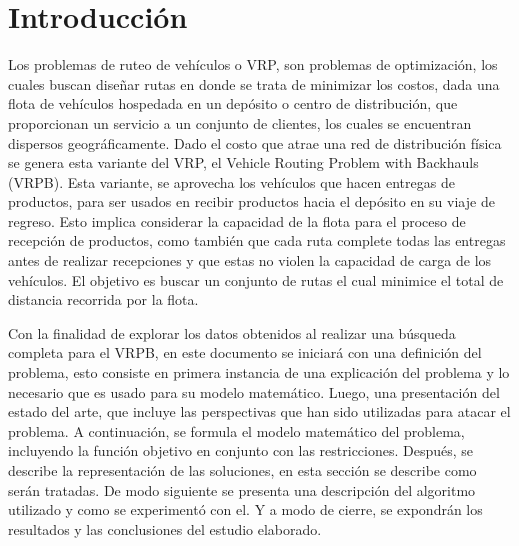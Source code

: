 \documentclass[letter, 10pt]{article}
\begin{document}
\section{Introducción}

Los problemas de ruteo de vehículos o VRP, son problemas de optimización, los cuales buscan diseñar rutas en donde se trata de minimizar los costos, dada una flota de vehículos hospedada en un depósito o centro de distribución, que proporcionan un servicio a un conjunto de clientes, los cuales se encuentran dispersos geográficamente. Dado el costo que atrae una red de distribución física se genera esta variante del VRP, el Vehicle Routing Problem with Backhauls (VRPB). Esta variante, se aprovecha los vehículos que hacen entregas de productos, para ser usados en recibir productos hacia el depósito en su viaje de regreso. Esto implica considerar la capacidad de la flota para el proceso de recepción de productos, como también que cada ruta complete todas las entregas antes de realizar recepciones y que estas no violen la capacidad de carga de los vehículos. El objetivo es buscar un conjunto de rutas el cual minimice el total de distancia recorrida por la flota.
\\\par
Con la finalidad de explorar los datos obtenidos al realizar una búsqueda completa para el VRPB, en este documento se iniciará con una definición del problema, esto consiste en primera instancia de una explicación del problema y lo necesario que es usado para su modelo matemático. Luego, una presentación del estado del arte, que incluye las perspectivas que han sido utilizadas para atacar el problema. A continuación, se formula el modelo matemático del problema, incluyendo la función objetivo en conjunto con las restricciones. Después, se describe la representación de las soluciones, en esta sección se describe como serán tratadas. De modo siguiente se presenta una descripción del algoritmo utilizado y como se experimentó con el. Y a modo de cierre, se expondrán los resultados y las conclusiones del estudio elaborado.
\end{document}
